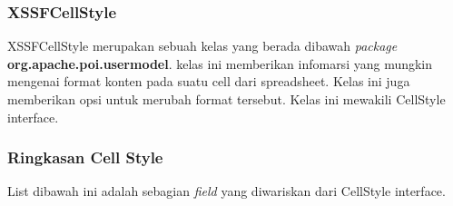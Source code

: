 \subsubsection{XSSFCellStyle}
XSSFCellStyle merupakan sebuah kelas yang berada dibawah \textit{package} \textbf{org.apache.poi.usermodel}. kelas ini memberikan infomarsi yang mungkin mengenai format konten pada suatu cell dari spreadsheet. Kelas ini juga memberikan opsi untuk merubah format tersebut. Kelas ini mewakili CellStyle interface.\cite{tutpoint}

\subsubsection{Ringkasan Cell Style}
List dibawah ini adalah sebagian \textit{field} yang diwariskan dari CellStyle interface.\cite{tutpoint}\\

